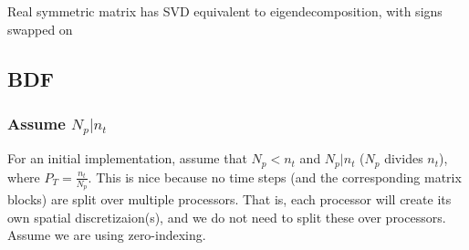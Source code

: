 \documentclass[a4paper,12pt]{article}
\begin{document}
Real symmetric matrix has SVD equivalent to eigendecomposition, with signs swapped on 




\subsection{BDF}


\subsubsection{Assume $N_p | n_t$}

For an initial implementation, assume that $N_p < n_t$ and $N_p | n_t$ ($N_p$ divides $n_t$), where $P_T = \frac{n_t}{N_p}$. This is nice
because no time steps (and the corresponding matrix blocks) are split over multiple processors. That is, each processor will create its own
spatial discretizaion(s), and we do not need to split these over processors. Assume we are using zero-indexing. 
\end{document}
